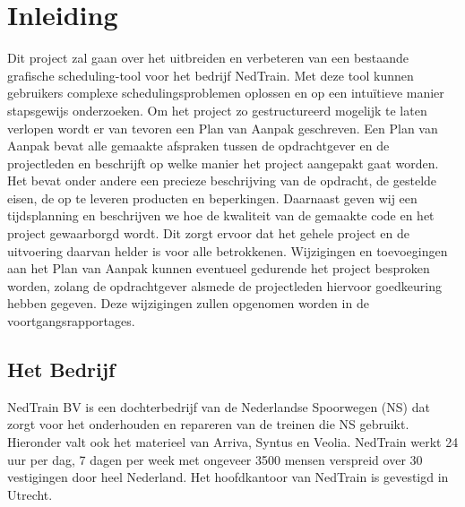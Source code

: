 \section{Inleiding}
Dit project zal gaan over het uitbreiden en verbeteren van een bestaande grafische scheduling-tool voor het bedrijf NedTrain. Met deze tool kunnen gebruikers complexe schedulingsproblemen oplossen en op een intu\"itieve manier stapsgewijs onderzoeken. Om het project zo gestructureerd mogelijk te laten verlopen wordt er van tevoren een Plan van Aanpak geschreven. Een Plan van Aanpak bevat alle gemaakte afspraken tussen de opdrachtgever en de projectleden en beschrijft op welke manier het project aangepakt gaat worden. Het bevat onder andere een precieze beschrijving van de opdracht, de gestelde eisen, de op te leveren producten en beperkingen. Daarnaast geven wij een tijdsplanning en beschrijven we hoe de kwaliteit van de gemaakte code en het project gewaarborgd wordt. Dit zorgt ervoor dat het gehele project en de uitvoering daarvan helder is voor alle betrokkenen. Wijzigingen en toevoegingen aan het Plan van Aanpak kunnen eventueel gedurende het project besproken worden, zolang de opdrachtgever alsmede de projectleden hiervoor goedkeuring hebben gegeven. Deze wijzigingen zullen opgenomen worden in de voortgangsrapportages.

\subsection{Het Bedrijf}
NedTrain BV is een dochterbedrijf van de Nederlandse Spoorwegen (NS) dat zorgt voor het onderhouden en repareren van de treinen die NS gebruikt. Hieronder valt ook het materieel van Arriva, Syntus en Veolia. NedTrain werkt 24 uur per dag, 7 dagen per week met ongeveer 3500 mensen verspreid over 30 vestigingen door heel Nederland. Het hoofdkantoor van NedTrain is gevestigd in Utrecht.

